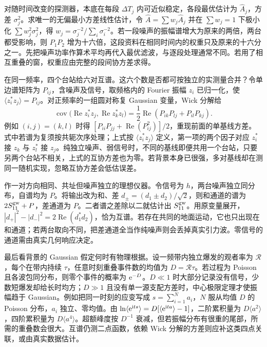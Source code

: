 对随时间改变的探测器，本底在每段 $\Delta T_j$ 内可近似稳定，各段最优估计为 $\widehat A_j$，方差 $\sigma_j^2$。求唯一的无偏最小方差线性估计，令 $\widehat A=\sum w_j\widehat A_j$ 并在 $\sum w_j=1$ 下极小化 $\sum w_j^2\sigma_j^2$，得 $w_j=\sigma_j^{-2}/\sum_i\sigma_i^{-2}$。若一段噪声的振幅谱增大为原来的两倍，两台都受影响，则 $P_1P_2$ 增为十六倍，这段资料在相同时间内的权重只及原来的十六分之一。先把噪声功率作算术平均再代入最优滤波，与逐段处理通常不同。若用了相互重叠的窗，权重应由完整的段间协方差求得。

在同一频率，四个台站给六对互谱。这六个数是否都可按独立的实测量合并？令单边谱矩阵为 $P_{ij}$，含噪声及信号，取频格内的 Fourier 振幅 $z_i$ 已归一化，使 $\langle z_i^*z_j\rangle=P_{ij}$。对正频率的一组圆对称复 Gaussian 变量，Wick 分解给
\[
 \operatorname{cov}\big(\operatorname{Re} z_i^*z_j,\operatorname{Re} z_k^*z_l\big)
 =\frac{1}{2}\operatorname{Re}(P_{ik}P_{lj}+P_{il}P_{kj}).
\]
例如 $(i,j)=(k,l)$ 时得 $[P_{ii}P_{jj}+\operatorname{Re}(P_{ij}^2)]/2$，重现前面的单基线方差。式中若谱为复须按共轭次序处理；上式按 $\langle z_i^*z_j\rangle$ 定义，第一项的两个因子对应 $z_i^*$ 接 $z_k$ 与 $z_l^*$ 接 $z_j$。纯独立噪声、弱信号时，不同的基线即便共用一个台站，只要另两个台站不相关，上式的互协方差也为零。若背景本身已很强，多对基线却在测同一随机实现，忽略互协方差会低估误差。

作一对方向相同、共址但噪声独立的理想仪器。令信号为 $h$，两台噪声独立同分布，自谱均为 $P$。将输出改为和、差 $d_\pm=(d_1\pm d_2)/\sqrt2$，则和通道的谱为 $2S_{11}^{\rm gw}+P$，差通道为 $P$。二者谱之差除以二就估计出 $S_{11}^{\rm gw}$。用原变量展开，$|d_+|^2-|d_-|^2=2\operatorname{Re}(d_1^*d_2)$，恰为互谱。若存在共同的地面运动，它也只出现在和通道；若两台取向不同，把差通道全当作纯噪声则会丢掉真实引力波。零信号的通道需由真实几何响应决定。

最后看背景的 Gaussian 假定何时有物理根据。设一频带内独立爆发的观者率为 $\mathcal R$，每个在带内持续 $\tau$，任意时刻重叠事件数的均值为 $D=\mathcal R\tau$。若过程为 Poisson 且各波包同分布，则零个事件的概率为 $\mathrm{e}^{-D}$。$D\ll1$ 时大部分记录没有信号，少数短爆发却给长时均方；$D\gg1$ 且没有单一源支配方差时，中心极限定理才使振幅趋于 Gaussian。例如把同一时刻的应变写成 $s=\sum_{i=1}^N a_i$，$N$ 服从均值 $D$ 的 Poisson 分布，$a_i$ 独立、零均值。由 $\ln\langle\mathrm{e}^{\mathrm{i} t s}\rangle=D[\langle\mathrm{e}^{\mathrm{i} t a}\rangle-1]$，二阶累积量为 $D\langle a^2\rangle$，四阶累积量为 $D\langle a^4\rangle$。超额峰度按 $D^{-1}$ 衰减，但若振幅分布有很重的尾部，所需的重叠数会很大。互谱仍测二点函数，依赖 Wick 分解的方差则应补这类四点关联，或由真实数据估计。

